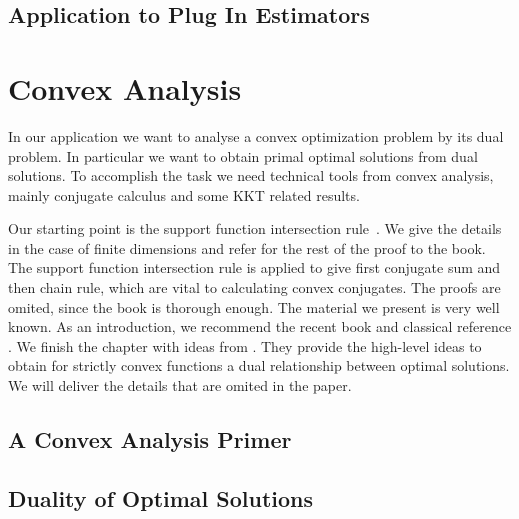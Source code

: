 \documentclass[11pt, a4paper, BCOR=10mm, DIV=11]{scrbook}
\theoremstyle{definition}
\theoremstyle{plain}
\begin{document}
  \section{Application to Plug In Estimators}
  

\chapter{Convex Analysis}
In our application we want to analyse a convex optimization problem by its dual problem.
In particular we want to obtain primal optimal solutions from dual solutions.
To accomplish the task we need technical tools from convex analysis, 
mainly conjugate calculus and some KKT related results.

Our starting point is 
the support function intersection rule~\cite[Theorem 4.23]{Mordukhovich2022}.
We give the details in the case of finite dimensions and refer for the rest of the proof to the book.
The support function intersection rule is applied to give first conjugate sum and then chain rule,
which are vital to calculating convex conjugates. The proofs are omited, since the book is thorough enough. 
The material we present is very well known.
As an introduction, we recommend the recent book \cite{Mordukhovich2022} and classical reference \cite{Rockafellar1970}.
We finish the chapter with ideas from \cite{Tseng1991}. 
They provide the high-level ideas to obtain for strictly convex
functions a dual relationship between optimal solutions.
We will deliver the details that are omited in the paper.
  \section{A Convex Analysis Primer}
  
%
  \section{Duality of Optimal Solutions}
  
\end{document}
